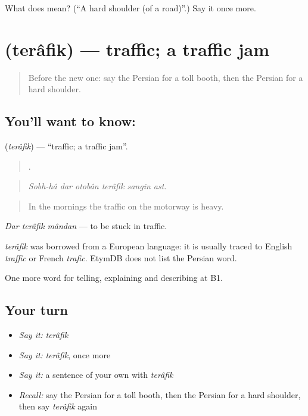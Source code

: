 \begin{tcolorbox}[breakable,colback=teal!4,colframe=teal!35!black,title={Before you move on}]
What does   mean? (\textquotedblleft{}A hard shoulder (of a road)\textquotedblright{}.) Say it once more.
\end{tcolorbox}
\section[\texorpdfstring{\fa{ترافیک} (terâfik)}{ترافیک (terâfik)}]{ (terâfik) — traffic; a traffic jam}

\label{lesson:FA-C425-terafik}



\begin{quote}
Before the new one: say the Persian for a toll booth, then the Persian for a hard shoulder.
\end{quote}

\subsection*{You'll want to know: }
\textbf{} (\emph{terâfik}) — \textquotedblleft{}traffic; a traffic jam\textquotedblright{}.

\begin{quote}
     .
\end{quote}

\begin{quote}
\emph{Sobh-hâ dar otobân terâfik sangin ast.}
\end{quote}

\begin{quote}
In the mornings the traffic on the motorway is heavy.
\end{quote}

\emph{Dar terâfik mândan} — to be stuck in traffic.

\begin{cousinweb}
\emph{terâfik} was borrowed from a European language: it is usually traced to English \emph{traffic} or French \emph{trafic}. EtymDB does not list the Persian word.
\end{cousinweb}

\begin{grammarlens}[title={What you've built}]
One more word for telling, explaining and describing at B1.
\end{grammarlens}

\subsection*{Your turn}
\begin{itemize}
\raggedright
  \item \emph{Say it:} \emph{terâfik}
  \item \emph{Say it:} \emph{terâfik}, once more
  \item \emph{Say it:} a sentence of your own with \emph{terâfik}
  \item \emph{Recall:} say the Persian for a toll booth, then the Persian for a hard shoulder, then say \emph{terâfik} again
\end{itemize}


